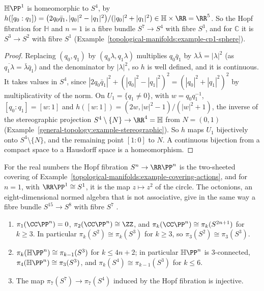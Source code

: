 \begin{proposition}\label{topological-manifolds:proposition-hp1-sphere}
$\mathbb{H}\PP^1$ is homeomorphic to $S^4$, by $h([q_0 : q_1]) = \bigl(2q_0\bar q_1, |q_0|^2 - |q_1|^2\bigr)/(|q_0|^2 + |q_1|^2) \in \mathbb{H} \times \RR = \RR^5$. So the Hopf fibration for $\mathbb{H}$ and $n = 1$ is a fibre
bundle $S^7 \to S^4$ with fibre $S^3$, and for $\mathbb{C}$ it is $S^3 \to S^2$ with fibre $S^1$ (Example~\ref{topological-manifolds:example-cp1-sphere}).
\end{proposition}

\begin{proof}
Replacing $(q_0, q_1)$ by $(q_0\lambda, q_1\lambda)$ multiplies $q_0\bar q_1$ by $\lambda\bar\lambda = |\lambda|^2$ (as $\overline{q_1\lambda} = \bar\lambda\bar q_1$) and the denominator by $|\lambda|^2$, so $h$ is well defined, and it is continuous.
It takes values in $S^4$, since $|2q_0\bar q_1|^2 + (|q_0|^2 - |q_1|^2)^2 = (|q_0|^2 + |q_1|^2)^2$ by multiplicativity of the norm. On $U_1 = \{q_1 \neq 0\}$, with $w = q_0q_1^{-1}$, $[q_0 : q_1] = [w : 1]$ and
$h([w : 1]) = (2w, |w|^2 - 1)/(|w|^2 + 1)$, the inverse of the stereographic projection $S^4 \setminus \{N\} \to \RR^4 = \mathbb{H}$ from $N = (0, 1)$ (Example~\ref{general-topology:example-stereographic}). So $h$ maps $U_1$
bijectively onto $S^4 \setminus \{N\}$, and the remaining point $[1 : 0]$ to $N$. A continuous bijection from a compact space to a Hausdorff space is a homeomorphism.
\end{proof}

For the real numbers the Hopf fibration $S^n \to \RR\PP^n$ is the two-sheeted covering of Example~\ref{topological-manifolds:example-covering-actions}, and for $n = 1$, with $\RR\PP^1 \cong S^1$, it is the map
$z \mapsto z^2$ of the circle. The octonions, an eight-dimensional normed algebra that is not associative, give in the same way a fibre bundle $S^{15} \to S^8$ with fibre $S^7$ \cite[Section 4.2]{hatcher-at}.

\begin{corollary}\label{topological-manifolds:corollary-hopf-homotopy}
\begin{enumerate}
\item $\pi_1(\CC\PP^n) = 0$, $\pi_2(\CC\PP^n) \cong \ZZ$, and $\pi_k(\CC\PP^n) \cong \pi_k(S^{2n+1})$ for $k \geq 3$. In particular $\pi_k(S^2) \cong \pi_k(S^3)$ for $k \geq 3$, so $\pi_3(S^2) \cong \pi_3(S^3)$.
\item $\pi_k(\mathbb{H}\PP^n) \cong \pi_{k-1}(S^3)$ for $k \leq 4n + 2$; in particular $\mathbb{H}\PP^n$ is $3$-connected, $\pi_4(\mathbb{H}\PP^n) \cong \pi_3(S^3)$, and $\pi_k(S^4) \cong \pi_{k-1}(S^3)$ for $k \leq 6$.
\item The map $\pi_7(S^7) \to \pi_7(S^4)$ induced by the Hopf fibration is injective.
\end{enumerate}
\end{corollary}

